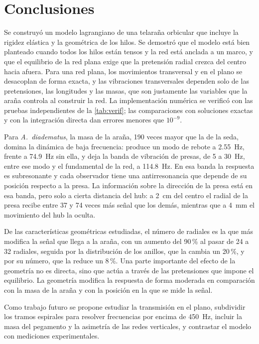 \documentclass[fleqn,final]{jaes}
\begin{document}
\section{Conclusiones}\label{sec:conclusiones}

Se construyó un modelo lagrangiano de una telaraña orbicular que incluye
la rigidez elástica y la geométrica de los hilos. Se demostró que el
modelo está bien planteado cuando todos los hilos están tensos y la red
está anclada a un marco, y que el equilibrio de la red plana exige que la
pretensión radial crezca del centro hacia afuera. Para una red plana, los
movimientos transversal y en el plano se desacoplan de forma exacta, y las
vibraciones transversales dependen solo de las pretensiones, las
longitudes y las masas, que son justamente las variables que la araña
controla al construir la red. La implementación numérica se verificó con
las pruebas independientes de la \cref{tab:verif}; las comparaciones con soluciones exactas y
con la integración directa dan errores menores que $10^{-9}$.

Para \textit{A.~diadematus}, la masa de la araña, 190 veces mayor que la
de la seda, domina la dinámica de baja frecuencia: produce un modo de
rebote a 2.55~Hz, frente a 74.9~Hz sin ella, y deja la banda de vibración
de presas, de 5 a 30~Hz, entre ese modo y el fundamental de la red, a
114.8~Hz. En esa banda la respuesta es subresonante y cada observador
tiene una antirresonancia que depende de su posición respecto a la presa.
La información sobre la dirección de la presa está en esa banda, pero
solo a cierta distancia del hub: a 2~cm del centro el radial de la presa
recibe entre 37 y 74 veces más señal que los demás, mientras que a 4~mm el
movimiento del hub la oculta.

De las características geométricas estudiadas, el número de radiales es
la que más modifica la señal que llega a la araña, con un aumento del
90\,\% al pasar de 24 a 32 radiales, seguida por la distribución de los
anillos, que la cambia un 20\,\%, y por su número, que la reduce un
8\,\%. Una parte importante del
efecto de la geometría no es directa, sino que actúa a través de las
pretensiones que impone el equilibrio. La geometría modifica la respuesta
de forma moderada en comparación con la masa de la araña y con la
posición en la que se mide la señal.

Como trabajo futuro se propone estudiar la transmisión en el plano,
subdividir los tramos espirales para resolver frecuencias por encima de
450~Hz, incluir la masa del pegamento y la asimetría de las redes
verticales, y contrastar el modelo con mediciones experimentales.



\end{document}
